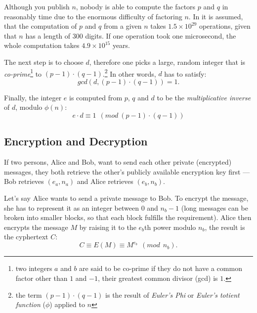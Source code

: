 Although you  publish $n$, nobody is  able to compute the  factors $p$ and
$q$ in  reasonably time due to  the enormous difficulty  of factoring $n$.
In \cite{rivest77method}  it is assumed,  that the computation of  $p$ and
$q$ from a given $n$ takes $1.5 \times 10^{29}$ operations, given that $n$
has a length  of $300$ digits. If one operation  took one microsecond, the
whole computation takes $4.9 \times 10^{15}$ years.

The  next step  is to  choose  $d$, therefore  one picks  a large,  random
integer that is \emph{co-prime}\footnote{two integers $a$ and $b$ are said
  to be co-prime  if they do not  have a common factor other  than $1$ and
  $-1$, \ie their greatest common divisor  (gcd) is $1$.} to $(p-1) \cdot
(q-1)$.\footnote{the term $(p-1)\cdot(q-1)$ is the result of \emph{Euler's
    Phi} or  \emph{Euler's totient function}  ($\phi$) applied to  $n$} In
other words, $d$ has to satisfy:
\begin{equation*}
  \label{eq:compute-d}
  gcd(d, (p-1) \cdot (q-1)) = 1.
\end{equation*}

Finally,  the integer $e$  is computed  from $p$,  $q$ and  $d$ to  be the
\emph{multiplicative inverse} of $d$, modulo $\phi(n)$:
\begin{equation*}
  \label{eq:compute-e}
  e \cdot d \equiv 1\ \ (mod\ (p-1) \cdot (q-1))
\end{equation*}

\subsection{Encryption and Decryption}

If  two  persons,  Alice  and   Bob,  want  to  send  each  other  private
(\ie encrypted)  messages,  they   both  retrieve  the  other's  publicly
available encryption  key first ---  Bob retrieves $(e_a, n_a)$  and Alice
retrieves $(e_b, n_b)$.

Let's say  Alice wants to send a  private message to Bob.   To encrypt the
message, she has to  represent it as an integer between $0$  and $n_b - 1$
(long  messages can  be broken  into smaller  blocks, so  that  each block
fulfills the requirement). Alice then  encrypts the message $M$ by raising
it to the $e_b$th power modulo $n_b$, the result is the cyphertext $C$:
\begin{equation*}
  \label{eq:encrypt-message}
  C \equiv E(M) \equiv M^{e_b}\ \ (mod\ \ n_b).
\end{equation*}

